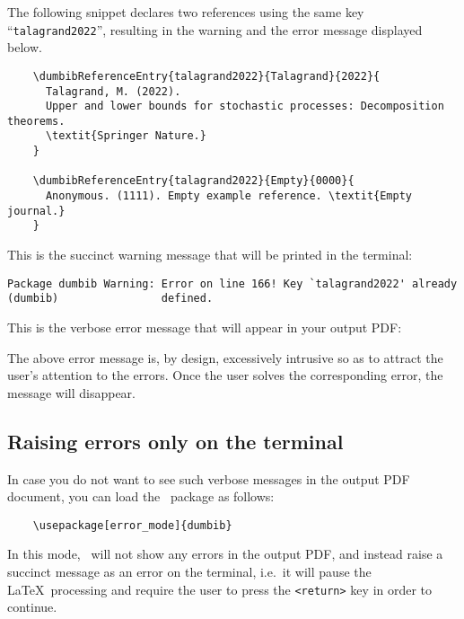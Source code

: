 \documentclass[letter, 11pt]{article}
\begin{document}
  The following snippet declares two references using the same key ``\texttt{talagrand2022}'', resulting in the warning and the error message displayed below.
  \begin{verbatim}
    \dumbibReferenceEntry{talagrand2022}{Talagrand}{2022}{
      Talagrand, M. (2022).
      Upper and lower bounds for stochastic processes: Decomposition theorems.
      \textit{Springer Nature.}
    }
    
    \dumbibReferenceEntry{talagrand2022}{Empty}{0000}{
      Anonymous. (1111). Empty example reference. \textit{Empty journal.}
    }
  \end{verbatim}
  This is the succinct warning message that will be printed in the terminal:
\begin{verbatim}
Package dumbib Warning: Error on line 166! Key `talagrand2022' already
(dumbib)                defined.
\end{verbatim}
  This is the verbose error message that will appear in your output PDF:
  
  
  The above error message is, by design, excessively intrusive so as to attract the user's attention to the errors. Once the user solves the corresponding error, the message will disappear.

  \subsection*{Raising errors only on the terminal}
  In case you do not want to see such verbose messages in the output PDF document, you can load the \dumbib\ package as follows:
  \begin{verbatim}
    \usepackage[error_mode]{dumbib}
  \end{verbatim}
  In this mode, \dumbib\ will not show any errors in the output PDF, and instead raise a succinct message as an error on the terminal, i.e.\ it will pause the \LaTeX\ processing and require the user to press the \texttt{<return>} key in order to continue.
\end{document}
